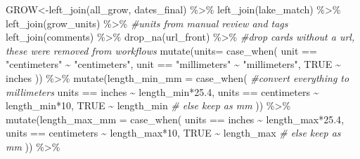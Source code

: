 \documentclass[
]{article}
\newenvironment{Shaded}{\begin{snugshade}}{\end{snugshade}}
\newcommand{\AttributeTok}[1]{\textcolor[rgb]{0.77,0.63,0.00}{#1}}
\newcommand{\CommentTok}[1]{\textcolor[rgb]{0.56,0.35,0.01}{\textit{#1}}}
\newcommand{\ConstantTok}[1]{\textcolor[rgb]{0.00,0.00,0.00}{#1}}
\newcommand{\DecValTok}[1]{\textcolor[rgb]{0.00,0.00,0.81}{#1}}
\newcommand{\FloatTok}[1]{\textcolor[rgb]{0.00,0.00,0.81}{#1}}
\newcommand{\FunctionTok}[1]{\textcolor[rgb]{0.00,0.00,0.00}{#1}}
\newcommand{\NormalTok}[1]{#1}
\newcommand{\OtherTok}[1]{\textcolor[rgb]{0.56,0.35,0.01}{#1}}
\newcommand{\SpecialCharTok}[1]{\textcolor[rgb]{0.00,0.00,0.00}{#1}}
\newcommand{\StringTok}[1]{\textcolor[rgb]{0.31,0.60,0.02}{#1}}
\begin{document}
\begin{Shaded}
\begin{Highlighting}[]
\NormalTok{GROW}\OtherTok{\textless{}{-}}\FunctionTok{left\_join}\NormalTok{(all\_grow, dates\_final) }\SpecialCharTok{\%\textgreater{}\%}
  \FunctionTok{left\_join}\NormalTok{(lake\_match) }\SpecialCharTok{\%\textgreater{}\%}
  \FunctionTok{left\_join}\NormalTok{(grow\_units) }\SpecialCharTok{\%\textgreater{}\%} \CommentTok{\#units from manual review and tags}
  \FunctionTok{left\_join}\NormalTok{(comments) }\SpecialCharTok{\%\textgreater{}\%}
  \FunctionTok{drop\_na}\NormalTok{(}\StringTok{\textquotesingle{}url\_front\textquotesingle{}}\NormalTok{) }\SpecialCharTok{\%\textgreater{}\%} \CommentTok{\#drop cards without a url, these were removed from workflows }
  \FunctionTok{mutate}\NormalTok{(}\AttributeTok{units=} \FunctionTok{case\_when}\NormalTok{(}
\NormalTok{    unit }\SpecialCharTok{==} \StringTok{"centimeters"} \SpecialCharTok{\textasciitilde{}} \StringTok{"centimeters"}\NormalTok{,}
\NormalTok{    unit }\SpecialCharTok{==} \StringTok{"millimeters"} \SpecialCharTok{\textasciitilde{}} \StringTok{"millimeters"}\NormalTok{,}
    \ConstantTok{TRUE} \SpecialCharTok{\textasciitilde{}} \StringTok{\textquotesingle{}inches\textquotesingle{}}\NormalTok{   )) }\SpecialCharTok{\%\textgreater{}\%}
  \FunctionTok{mutate}\NormalTok{(}\AttributeTok{length\_min\_mm =} \FunctionTok{case\_when}\NormalTok{( }\CommentTok{\#convert everything to millimeters }
\NormalTok{    units }\SpecialCharTok{==} \StringTok{\textquotesingle{}inches\textquotesingle{}} \SpecialCharTok{\textasciitilde{}}\NormalTok{ length\_min}\SpecialCharTok{*}\FloatTok{25.4}\NormalTok{, }
\NormalTok{    units }\SpecialCharTok{==} \StringTok{\textquotesingle{}centimeters\textquotesingle{}} \SpecialCharTok{\textasciitilde{}}\NormalTok{ length\_min}\SpecialCharTok{*}\DecValTok{10}\NormalTok{, }
    \ConstantTok{TRUE} \SpecialCharTok{\textasciitilde{}}\NormalTok{ length\_min }\CommentTok{\# else keep as mm }
\NormalTok{  )) }\SpecialCharTok{\%\textgreater{}\%}
  \FunctionTok{mutate}\NormalTok{(}\AttributeTok{length\_max\_mm =} \FunctionTok{case\_when}\NormalTok{(}
\NormalTok{    units }\SpecialCharTok{==} \StringTok{\textquotesingle{}inches\textquotesingle{}} \SpecialCharTok{\textasciitilde{}}\NormalTok{ length\_max}\SpecialCharTok{*}\FloatTok{25.4}\NormalTok{, }
\NormalTok{    units }\SpecialCharTok{==} \StringTok{\textquotesingle{}centimeters\textquotesingle{}} \SpecialCharTok{\textasciitilde{}}\NormalTok{ length\_max}\SpecialCharTok{*}\DecValTok{10}\NormalTok{, }
    \ConstantTok{TRUE} \SpecialCharTok{\textasciitilde{}}\NormalTok{ length\_max }\CommentTok{\# else keep as mm }
\NormalTok{  ))  }\SpecialCharTok{\%\textgreater{}\%}

\end{Highlighting}
\end{Shaded}
\end{document}
